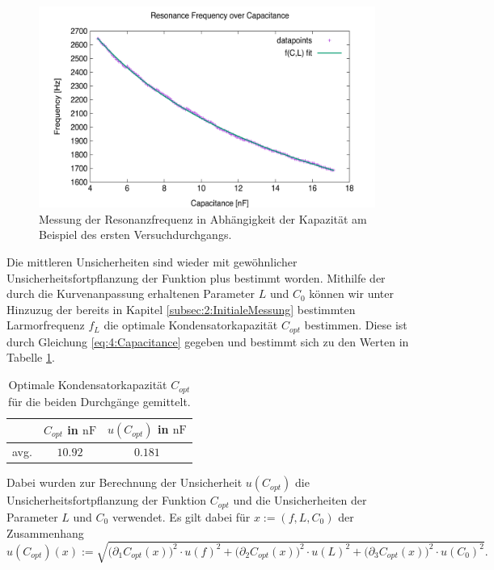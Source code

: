\documentclass[../../main.tex]{subfiles}
\begin{document}
        \begin{figure}[H]
            \centering
            \includegraphics[width=11cm]{Bilddateien/4/Messung1_Resonance_Freq_vs_Capacitance.png}
            \caption{Messung der Resonanzfrequenz in Abhängigkeit der Kapazität am Beispiel des ersten Versuchdurchgangs.}
            \label{fig:4:LCRResonance}
        \end{figure}
        Die mittleren Unsicherheiten sind wieder mit gewöhnlicher Unsicherheitsfortpflanzung der Funktion plus bestimmt worden. Mithilfe der durch die Kurvenanpassung erhaltenen Parameter $L$ und $C_0$ können wir unter Hinzuzug der bereits in Kapitel \ref{subsec:2:InitialeMessung} bestimmten Larmorfrequenz $f_L$ die optimale Kondensatorkapazität $C_{opt}$ bestimmen. Diese ist durch Gleichung \eqref{eq:4:Capacitance} gegeben und bestimmt sich zu den Werten in Tabelle \ref{tab:4:OptimalCapacitance}.
        \begin{table}[H]
            \centering
            \begin{tabular}{c|cc}
                \hline
                 & $C_{opt}$ in $\si{\nano\farad}$ & $u(C_{opt})$ in $\si{\nano\farad}$ \\
                \hline\hline
                avg. & $10.92$ & $0.181$\\
                \hline
            \end{tabular}
            \caption{Optimale Kondensatorkapazität $C_{opt}$ für die beiden Durchgänge gemittelt.}
            \label{tab:4:OptimalCapacitance}
        \end{table}
        Dabei wurden zur Berechnung der Unsicherheit $u(C_{opt})$ die Unsicherheitsfortpflanzung der Funktion $C_{opt}$ und die Unsicherheiten der Parameter $L$ und $C_0$ verwendet. Es gilt dabei für $x:=(f,L,C_0)$ der Zusammenhang
        \[
            u(C_{opt})(x) := \sqrt{\bigl(\partial_1C_{opt}(x)\bigr)^2\cdot u(f)^2 + \bigl(\partial_2C_{opt}(x)\bigr)^2\cdot u(L)^2 + \bigl(\partial_3C_{opt}(x)\bigr)^2\cdot u(C_0)^2}.
        \]
        
\end{document}
